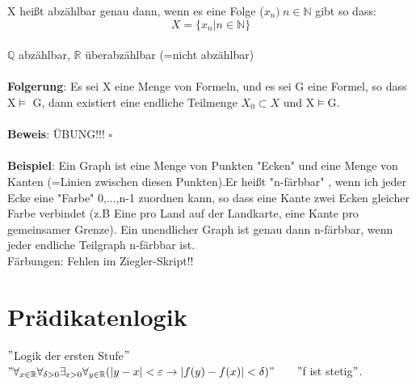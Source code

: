 \documentclass[a4paper]{scrartcl}
\begin{document}
X heißt abzählbar genau dann, wenn es eine Folge ($x_n)~n\in\mathbb{N}$ gibt so dass:\\
$$X=\{x_n|n\in\mathbb{N}\}$$\\
$\mathbb{Q}$ abzählbar, $\mathbb{R}$ überabzählbar (=nicht abzählbar)\\ \\
\textbf{Folgerung}: Es sei X eine Menge von Formeln, und es sei G eine Formel, so dass X$\models$ G, dann existiert eine endliche Teilmenge $X_0\subset X$ und X$\models$G.\\ \\
\textbf{Beweis}: ÜBUNG!!! $\square$\\ \\
\textbf{Beispiel}: Ein Graph ist eine Menge von Punkten "Ecken" und eine Menge von Kanten (=Linien zwischen diesen Punkten).Er heißt "n-färbbar" , wenn ich jeder Ecke eine "Farbe" 0,...,n-1 zuordnen kann, so dass eine Kante zwei Ecken gleicher Farbe 
verbindet (z.B Eine pro Land auf der Landkarte, eine Kante pro gemeinsamer Grenze). Ein unendlicher Graph ist genau dann n-färbbar, wenn jeder endliche Teilgraph n-färbbar ist.\\
Färbungen: Fehlen im Ziegler-Skript!!\\
\section{Prädikatenlogik}
$"$Logik der ersten Stufe$"$\\
$"\forall_{x\in\mathbb{R}}\forall_{\delta>0}\exists_{\varepsilon > 0}\forall_{y\in\mathbb{R}}(|y-x|<\varepsilon \rightarrow |f(y)-f(x)|<\delta)"$ ~~~$"$f ist stetig$"$.
\end{document}

